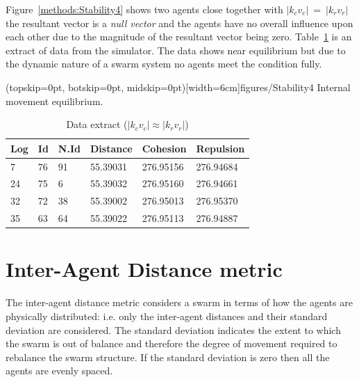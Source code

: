 \documentclass{ieeeaccess}
\begin{document}
Figure~\ref{methods:Stability4} shows two agents close together with
$|k_cv_c|~=~|k_rv_r|$ the resultant vector is a \textit{null vector} and the
agents have no overall influence upon each other due to the magnitude of the
resultant vector being zero. Table~\ref{tab:SampleEquilibrium} is an extract of
data from the simulator. The data shows near equilibrium but due to the dynamic
nature of a swarm system no agents meet the condition fully. 

\Figure[t!](topskip=0pt, botskip=0pt,
midskip=0pt)[width=6cm]{figures/Stability4} {Internal movement
equilibrium.\label{methods:Stability4}}


\begin{table}[H]
\begin{center}
\begin{tabular}{| l | l | l | l | l | l |}
\hline
Log &	Id &	N.Id &	Distance &	{\color{green}Cohesion} &	{\color{red}Repulsion} 	\\ \hline
7 & 76 &	91 & 55.39031 & {\color{green}276.95156} & {\color{red}276.94684} \\ \hline
24 & 75 & 6 & 55.39032 & {\color{green}276.95160} & {\color{red}276.94661} \\ \hline
32 & 72 & 38 &	55.39002 & {\color{green}276.95013} & {\color{red}276.95370} \\ \hline
35 & 63 & 64 & 55.39022 &	{\color{green}276.95113} &	{\color{red}276.94887} \\
\hline
\end{tabular}\caption{Data extract ($|k_cv_c| \approx |k_rv_r|$)} \label{tab:SampleEquilibrium}
\end{center}
\end{table} 

\section{Inter-Agent Distance metric}\label{Section:DistanceDynamics}
The inter-agent distance metric considers a swarm in terms of how the agents
are physically distributed: i.e. only the inter-agent distances and their
standard deviation are considered. The standard deviation indicates the extent
to which the swarm is out of balance and therefore the degree of movement
required to rebalance the swarm structure. If the standard deviation is zero
then all the agents are evenly spaced. 
\end{document}
